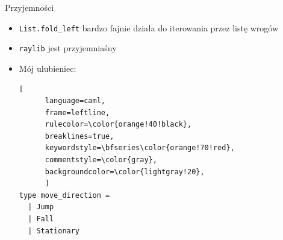 \documentclass{beamer}
\begin{document}
\begin{frame}[fragile]{Przyjemności}
  \begin{itemize}
    \item \lstinline{List.fold_left} bardzo fajnie działa do iterowania przez listę wrogów
    \item \lstinline{raylib} jest przyjemniaśny
    \item Mój ulubieniec:
      \begin{lstlisting}[
      language=caml, 
      frame=leftline,
      rulecolor=\color{orange!40!black}, 
      breaklines=true,
      keywordstyle=\bfseries\color{orange!70!red},
      commentstyle=\color{gray},
      backgroundcolor=\color{lightgray!20},
      ]
type move_direction = 
  | Jump
  | Fall 
  | Stationary
      \end{lstlisting}
  \end{itemize}

\end{frame}
\end{document}
